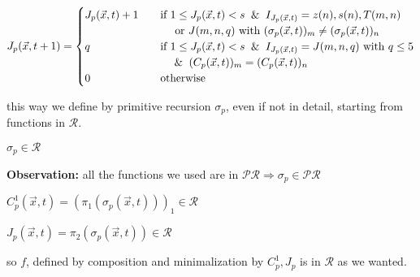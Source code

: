 \[
J_p(\vec{x}, t+1) = \begin{cases}
J_p(\vec{x}, t) + 1 & \quad \text{if } 1 \leq J_p(\vec{x}, t) < s \And I_{J_p(\vec{x}, t)} = z(n), s(n), T(m,n) \\
& \quad \quad \text{ or } J(m,n,q) \text{ with } (\sigma_p(\vec{x}, t))_m \neq (\sigma_p(\vec{x}, t))_n \\
q & \quad \text{if } 1 \leq J_p(\vec{x}, t) < s \And I_{J_p(\vec{x}, t)} = J(m,n,q) \text{ with } q\leq 5 \\
& \quad \quad \And (C_p(\vec{x}, t))_m = (C_p(\vec{x}, t))_n \\
0 & \quad \text{otherwise}
\end{cases}
\]

this way we define by primitive recursion $\sigma_p$, even if not in
detail, starting from functions in $\mathcal{R}$.

$\sigma_p \in \mathcal{R}$

\textbf{Observation:} all the functions we used are in  $\mathcal{PR} \Rightarrow \sigma_p \in \mathcal{PR}$

$C_p^1(\vec{x}, t) = (\pi_1(\sigma_p(\vec{x}, t)))_1 \in \mathcal{R}$

$J_p(\vec{x}, t) = \pi_2(\sigma_p(\vec{x}, t)) \in \mathcal{R}$

so $f$, defined by composition and minimalization by $C_p^1, J_p$ is in $\mathcal{R}$ as we wanted.

\hfill \qedsymbol
